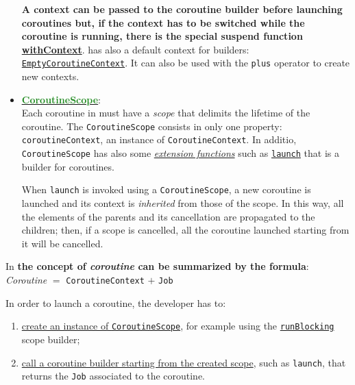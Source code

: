 \begin{itemize}
	\textbf{A context can be passed to the coroutine builder before launching coroutines but, if the context has to be switched while the coroutine is running, there is the special suspend function \href{https://kotlinlang.org/api/kotlinx.coroutines/kotlinx-coroutines-core/kotlinx.coroutines/with-context.html}{withContext}}.
	\Kotlin has also a default context for builders:  \href{https://kotlinlang.org/api/latest/jvm/stdlib/kotlin.coroutines/-empty-coroutine-context/}{\texttt{EmptyCoroutineContext}}.  It can also be used with the \texttt{plus} operator to create new contexts.
	
	\item \href{https://kotlinlang.org/api/kotlinx.coroutines/kotlinx-coroutines-core/kotlinx.coroutines/-coroutine-scope/}{\underline{\textbf{\textcolor{ForestGreen}{CoroutineScope}}}}:\\
	Each coroutine in \Kotlin must have a \textit{scope} that delimits the lifetime of the coroutine. The \texttt{CoroutineScope} consists in only one property: \texttt{coroutineContext}, an instance of \texttt{CoroutineContext}.
	In additio, \texttt{CoroutineScope} has also some \href{https://kotlinlang.org/docs/extensions.html}{\textit{extension functions}} such as \href{https://kotlinlang.org/api/kotlinx.coroutines/kotlinx-coroutines-core/kotlinx.coroutines/launch.html}{\texttt{launch}} that is a builder for coroutines.
	
	When \texttt{launch} is invoked using a \texttt{CoroutineScope}, a new coroutine is launched and its context is \textit{inherited} from those of the scope.
	In this way, all the elements of the parents and its cancellation are propagated to the children; then, if a scope is cancelled, all the coroutine launched starting from it will be cancelled.
\end{itemize}

\begin{center}
	In \Kotlin \textbf{the concept of \textit{coroutine} can be summarized by the formula}:\\
		\textit{Coroutine} $=$ \texttt{CoroutineContext} $+$ \texttt{Job}
\end{center}

In order to launch a coroutine, the developer has to:
\begin{enumerate}
	\item \underline{create an instance of \texttt{CoroutineScope}}, for example using the \href{https://kotlinlang.org/api/kotlinx.coroutines/kotlinx-coroutines-core/kotlinx.coroutines/run-blocking.html}{\texttt{runBlocking}} scope builder;
	
	\item \underline{call a coroutine builder starting from the created scope}, such as \texttt{launch}, that returns the \texttt{Job} associated to the coroutine.
\end{enumerate}

